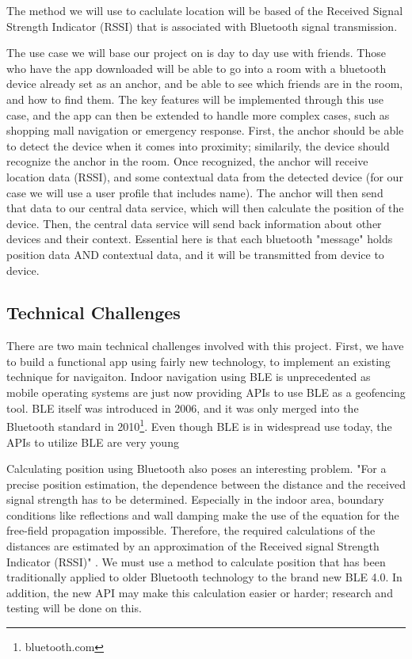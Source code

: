 \documentclass{sig-alternate}
\begin{document}
The method we will use to caclulate location will be based of the 
Received Signal Strength Indicator (RSSI) that is associated with 
Bluetooth signal transmission. 

The use case we will base our project on is day to day use with 
friends. Those who have the app downloaded will be able to go 
into a room with a bluetooth device already set as an anchor, and 
be able to see which friends are in the room, and how to find them. 
The key features will be implemented through this use case, and 
the app can then be extended to handle more complex cases,
such as shopping mall navigation or emergency response. 
First, the anchor should be able to detect the device when it comes
into proximity; similarily, the device should recognize the anchor in
the room. Once recognized, the anchor will receive location data
(RSSI), and some contextual data from the detected device (for our
case we will use a user profile that includes name). The anchor 
will then send that data to our central data service, which will
then calculate the position of the device. Then, the central data
service will send back information about other devices and their
context. Essential here is that each bluetooth "message" holds
position data AND contextual data, and it will be transmitted from
device to device. 

\subsection{Technical Challenges}
\label{subsec:tech_challenges}
There are two main technical challenges involved with this project.
First, we have to build a functional app using fairly new technology, 
to implement an existing technique for navigaiton. Indoor navigation 
using BLE is unprecedented as mobile operating systems are just now 
providing APIs to use BLE as a geofencing tool. BLE itself was 
introduced in 2006, and it was only merged into the Bluetooth standard 
in 2010\footnote{bluetooth.com}. Even though BLE is in widespread use
today, the APIs to utilize BLE are very young

Calculating position using Bluetooth also poses an interesting problem.
"For a precise position estimation, the dependence between the distance 
and the received signal strength has to be determined. Especially in 
the indoor area, boundary conditions like reflections and wall damping
make the use of the equation for the free-field propagation impossible. 
Therefore, the required calculations of the distances are estimated by 
an approximation of the Received signal Strength Indicator (RSSI)"
\cite{feldman}. We must use a method to calculate position that has
been traditionally applied to older Bluetooth technology to the brand
new BLE 4.0. In addition, the new API may make this calculation
easier or harder; research and testing will be done on this.
\end{document}

